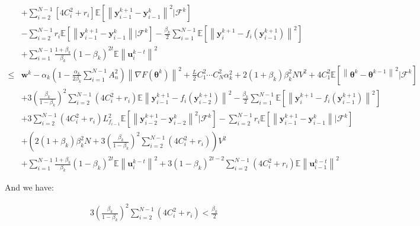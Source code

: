 \begin{equation*}
\begin{split}
&+\sum_{i=2}^{N-1}\left [ 4C_i^2+r_i \right ]\mathbb{E}\left [ \left \| \boldsymbol{y}_{i-1}^{k+1}-\boldsymbol{y}_{i-1}^{k} \right \|^2|\mathcal{F}^k \right ]\\
&-\sum_{i=2}^{N-1}r_i\mathbb{E}\left [ \left \| \boldsymbol{y}_{i-1}^{k+1}-\boldsymbol{y}_{i-1}^k \right \||\mathcal{F}^k \right ]-\frac{\beta_k}{2}\sum_{i=1}^{N-1}\mathbb{E}\left [ \left \| \boldsymbol{y}_i^{k+1}-f_i(\boldsymbol{y}_{i-1}^{k+1}) \right \|^2 \right ]\\
&+\sum_{i=1}^{N-1}\frac{1+\beta_k}{\beta_k}(1-\beta_k)^{2t}\mathbb{E}\left \| \boldsymbol{u}_i^{k-t} \right \|^2\\
\leq & \boldsymbol{w}^k-\alpha_k\left ( 1-\frac{\alpha_k}{2\beta_k}\sum_{i=1}^{N-1}A_n^2 \right )\left \| \nabla F\left ( \boldsymbol{\theta}^k \right ) \right \|^2+\frac{L}{2}C_1^2\cdots C_N^2\alpha_k^2+2(1+\beta_k)\beta_k^2NV^2+4C_1^2\mathbb{E}\left [ \left \| \boldsymbol{\theta}^k-\boldsymbol{\theta}^{k-1} \right \|^2|\mathcal{F}^k \right ]\\
&+3\left ( \frac{\beta_k}{1-\beta_k} \right )^2\sum_{i=2}^{N-1}\left ( 4C_i^2+r_i \right )
\mathbb{E}\left \| \boldsymbol{y}_{i-1}^{k+1}-f_i\left ( \boldsymbol{y}_{i-2}^{k+1} \right ) \right \|^2-\frac{\beta_k}{2}\sum_{i=1}^{N-1}\mathbb{E}\left [ \left \| \boldsymbol{y}_i^{k+1}-f_i\left ( \boldsymbol{y}_{i-1}^{k+1} \right ) \right \|^2 \right ]\\
&+3\sum_{i=2}^{N-1}\left ( 4C_i^2+r_i \right )L_{f_{i-1}}^2\mathbb{E}\left [ \left \| \boldsymbol{y}_{i-2}^{k+1}-\boldsymbol{y}_{i-2}^k \right \|^2|\mathcal{F}^k \right ]-\sum_{i=2}^{N-1}r_i\mathbb{E}\left [ \left \| \boldsymbol{y}_{i-1}^{k+1}-\boldsymbol{y}_{i-1}^k \right \||\mathcal{F}^k \right ]\\
&+\left ( 2\left ( 1+\beta_k \right )\beta_k^2N+3\left ( \frac{\beta_k}{1-\beta_k} \right )^2\sum_{i=2}^{N-1}\left ( 4C_i^2+r_i \right ) \right )V^2\\
&+\sum_{i=1}^{N-1}\frac{1+\beta_k}{\beta_k}\left ( 1-\beta_k \right )^{2t}\mathbb{E}\left \| \boldsymbol{u}_i^{k-t} \right \|^2+3\left ( 1-\beta_k \right )^{2t-2}\sum_{i=2}^{N-1}\left ( 4C_i^2+r_i \right )\mathbb{E}\left \| \boldsymbol{u}_{i-1}^{k-t} \right \|^2
\end{split}
\end{equation*}

And we have:

\begin{equation*}
\begin{split}
3\left ( \frac{\beta_k}{1-\beta_k} \right )^2\sum_{i=2}^{N-1}\left ( 4C_i^2+r_i \right )< \frac{\beta_k}{2}
\end{split}
\end{equation*}

